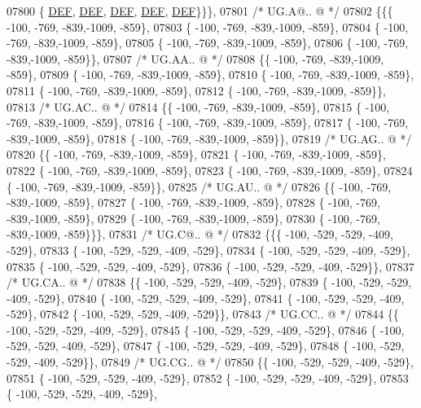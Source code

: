 \begin{DoxyCode}
07800 \{  \mbox{\hyperlink{1_88_84__epars_8h_a397419fc12b37ed479c8abb9d444d843}{DEF}},  \mbox{\hyperlink{1_88_84__epars_8h_a397419fc12b37ed479c8abb9d444d843}{DEF}},  \mbox{\hyperlink{1_88_84__epars_8h_a397419fc12b37ed479c8abb9d444d843}{DEF}},  \mbox{\hyperlink{1_88_84__epars_8h_a397419fc12b37ed479c8abb9d444d843}{DEF}},  \mbox{\hyperlink{1_88_84__epars_8h_a397419fc12b37ed479c8abb9d444d843}{DEF}}\}\}\},
07801 \textcolor{comment}{/* UG.A@.. @ */}
07802 \{\{\{ -100, -769, -839,-1009, -859\},
07803 \{ -100, -769, -839,-1009, -859\},
07804 \{ -100, -769, -839,-1009, -859\},
07805 \{ -100, -769, -839,-1009, -859\},
07806 \{ -100, -769, -839,-1009, -859\}\},
07807 \textcolor{comment}{/* UG.AA.. @ */}
07808 \{\{ -100, -769, -839,-1009, -859\},
07809 \{ -100, -769, -839,-1009, -859\},
07810 \{ -100, -769, -839,-1009, -859\},
07811 \{ -100, -769, -839,-1009, -859\},
07812 \{ -100, -769, -839,-1009, -859\}\},
07813 \textcolor{comment}{/* UG.AC.. @ */}
07814 \{\{ -100, -769, -839,-1009, -859\},
07815 \{ -100, -769, -839,-1009, -859\},
07816 \{ -100, -769, -839,-1009, -859\},
07817 \{ -100, -769, -839,-1009, -859\},
07818 \{ -100, -769, -839,-1009, -859\}\},
07819 \textcolor{comment}{/* UG.AG.. @ */}
07820 \{\{ -100, -769, -839,-1009, -859\},
07821 \{ -100, -769, -839,-1009, -859\},
07822 \{ -100, -769, -839,-1009, -859\},
07823 \{ -100, -769, -839,-1009, -859\},
07824 \{ -100, -769, -839,-1009, -859\}\},
07825 \textcolor{comment}{/* UG.AU.. @ */}
07826 \{\{ -100, -769, -839,-1009, -859\},
07827 \{ -100, -769, -839,-1009, -859\},
07828 \{ -100, -769, -839,-1009, -859\},
07829 \{ -100, -769, -839,-1009, -859\},
07830 \{ -100, -769, -839,-1009, -859\}\}\},
07831 \textcolor{comment}{/* UG.C@.. @ */}
07832 \{\{\{ -100, -529, -529, -409, -529\},
07833 \{ -100, -529, -529, -409, -529\},
07834 \{ -100, -529, -529, -409, -529\},
07835 \{ -100, -529, -529, -409, -529\},
07836 \{ -100, -529, -529, -409, -529\}\},
07837 \textcolor{comment}{/* UG.CA.. @ */}
07838 \{\{ -100, -529, -529, -409, -529\},
07839 \{ -100, -529, -529, -409, -529\},
07840 \{ -100, -529, -529, -409, -529\},
07841 \{ -100, -529, -529, -409, -529\},
07842 \{ -100, -529, -529, -409, -529\}\},
07843 \textcolor{comment}{/* UG.CC.. @ */}
07844 \{\{ -100, -529, -529, -409, -529\},
07845 \{ -100, -529, -529, -409, -529\},
07846 \{ -100, -529, -529, -409, -529\},
07847 \{ -100, -529, -529, -409, -529\},
07848 \{ -100, -529, -529, -409, -529\}\},
07849 \textcolor{comment}{/* UG.CG.. @ */}
07850 \{\{ -100, -529, -529, -409, -529\},
07851 \{ -100, -529, -529, -409, -529\},
07852 \{ -100, -529, -529, -409, -529\},
07853 \{ -100, -529, -529, -409, -529\},

\end{DoxyCode}
